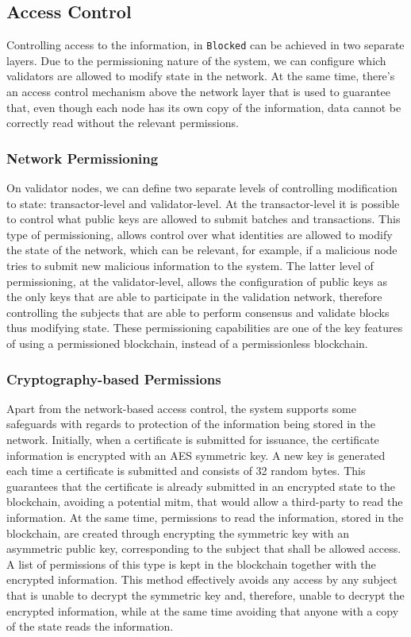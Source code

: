 \subsection{Access Control}
\label{sec:design-ac}

Controlling access to the information, in \texttt{Blocked} can be achieved in two separate layers. Due to the permissioning nature of the system, we can configure which validators are allowed to modify state in the network. At the same time, there's an access control mechanism above the network layer that is used to guarantee that, even though each node has its own copy of the information, data cannot be correctly read without the relevant permissions.

\subsubsection{Network Permissioning}

On validator nodes, we can define two separate levels of controlling modification to state: transactor-level and validator-level. At the transactor-level it is possible to control what public keys are allowed to submit batches and transactions. This type of permissioning, allows control over what identities are allowed to modify the state of the network, which can be relevant, for example, if a malicious node tries to submit new malicious information to the system. The latter level of permissioning, at the validator-level, allows the configuration of public keys as the only keys that are able to participate in the validation network, therefore controlling the subjects that are able to perform consensus and validate blocks thus modifying state. These permissioning capabilities are one of the key features of using a permissioned blockchain, instead of a permissionless blockchain.

\subsubsection{Cryptography-based Permissions}

Apart from the network-based access control, the system supports some safeguards with regards to protection of the information being stored in the network. Initially, when a certificate is submitted for issuance, the certificate information is encrypted with an AES symmetric key. A new key is generated each time a certificate is submitted and consists of 32 random bytes. This guarantees that the certificate is already submitted in an encrypted state to the blockchain, avoiding a potential \gls{mitm}, that would allow a third-party to read the information. At the same time, permissions to read the information, stored in the blockchain, are created through encrypting the symmetric key with an asymmetric public key, corresponding to the subject that shall be allowed access. A list of permissions of this type is kept in the blockchain together with the encrypted information. This method effectively avoids any access by any subject that is unable to decrypt the symmetric key and, therefore, unable to decrypt the encrypted information, while at the same time avoiding that anyone with a copy of the state reads the information.

